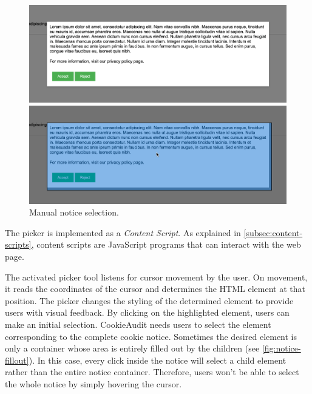 \begin{figure}
	\centering
	\begin{minipage}{0.48\textwidth}
		\centering
		\includegraphics[width=1.0\linewidth]{media/screenshot_unselected.png}
	\end{minipage}\hfill
	\begin{minipage}{0.48\textwidth}
		\centering
		\includegraphics[width=1.0\linewidth]{media/screenshot_selected.png}      
	\end{minipage}
	\caption{Manual notice selection.}
	\label{fig:screenshot-selection}
\end{figure}

The picker is implemented as a \emph{Content Script}. 
As explained in \cref{subsec:content-scripts}, content scripts are JavaScript programs that can interact with the web page.

The activated picker tool listens for cursor movement by the user. 
On movement, it reads the coordinates of the cursor and determines the HTML element at that position.
The picker changes the styling of the determined element to provide users with visual feedback.
By clicking on the highlighted element, users can make an initial selection.
CookieAudit needs users to select the element corresponding to the complete cookie notice. 
Sometimes the desired element is only a container whose area is entirely filled out by the children (see \cref{fig:notice-fillout}).
In this case, every click inside the notice will select a child element rather than the entire notice container. 
Therefore, users won't be able to select the whole notice by simply hovering the cursor.

